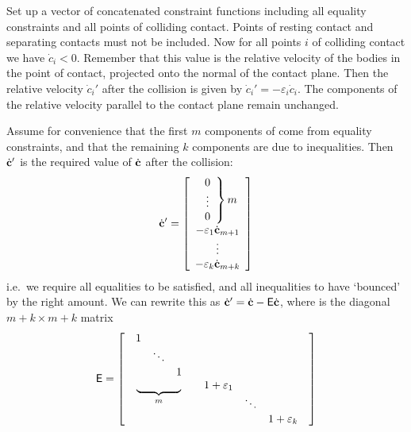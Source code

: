 Set up a vector  of concatenated constraint functions including all equality constraints
and all points of colliding contact. Points of resting contact and separating contacts must
not be included. Now for all points $i$ of colliding contact we have $\dot{c}_i < 0$.
Remember that this value is the relative velocity of the bodies in the point of contact,
projected onto the normal of the contact plane. Then the relative velocity $\dot{c}_i'$ after
the collision is given by $\dot{c}_i' = -\varepsilon_i \dot{c}_i$. The components of the relative
velocity parallel to the contact plane remain unchanged.

Assume for convenience that the first $m$ components of  come from equality constraints, and
that the remaining $k$ components are due to inequalities.
Then $\dot{\ve{c}}'$ is the required value of $\dot{\ve{c}}$ after the collision:
\begin{equation}
\dot{\ve{c}}' = \left[\begin{array}[m]{c}
    \left. \begin{array}{c} 0 \\\vdots\\ 0 \end{array} \right\} m \\
    -\varepsilon_1 \dot{\ve{c}}_{m+1} \\\vdots\\
    -\varepsilon_k \dot{\ve{c}}_{m+k}
    \end{array}\right]
\end{equation}
i.e.\ we require all equalities to be satisfied, and all inequalities to have `bounced' by the
right amount. We can rewrite this as $\dot{\ve{c}}' = \dot{\ve{c}} - \m{E}\dot{\ve{c}}$, where
 is the diagonal $m+k \times m+k$ matrix
\begin{equation}
\mathsf{E} = \left[ \begin{array}{cc}
    \begin{array}{ccc} 1 \\ & \ddots \\ && 1 \end{array} \\
    \underbrace{\quad\quad\quad\quad}_m &
    \begin{array}[t]{ccc} 1+\varepsilon_1 \\ & \ddots \\ && 1+\varepsilon_k \end{array}
    \end{array} \right]
\end{equation}

